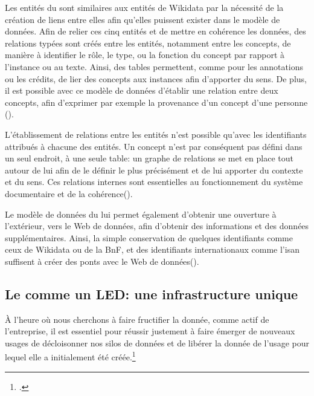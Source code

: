 Les entités du \ldd sont similaires aux entités de Wikidata par la nécessité de la création de liens entre elles afin qu'elles puissent exister dans le modèle de données. Afin de relier ces cinq entités et de mettre en cohérence les données, des relations typées sont créés entre les entités, notamment entre les concepts, de manière à identifier le rôle, le type, ou la fonction du concept par rapport à l'instance ou au texte. Ainsi, des tables permettent, comme pour les annotations ou les crédits, de lier des concepts aux instances afin d'apporter du sens. De plus, il est possible avec ce modèle de données d'établir une relation entre deux concepts, afin d'exprimer par exemple la provenance d'un concept d'une personne (). 


L'établissement de relations entre les entités n'est possible qu'avec les identifiants attribués à chacune des entités. Un concept n'est par conséquent pas défini dans un seul endroit, à une seule table: un graphe de relations se met en place tout autour de lui afin de le définir le plus précisément et de lui apporter du contexte et du sens. Ces relations internes sont essentielles au fonctionnement du système documentaire et de la cohérence().


Le modèle de données du \ldd lui permet également d'obtenir une ouverture à l'extérieur, vers le Web de données, afin d'obtenir des informations et des données supplémentaires. Ainsi, la simple conservation de quelques identifiants comme ceux de Wikidata ou de la BnF, et des identifiants internationaux comme l'\ac{isan} suffisent à créer des ponts avec le Web de données().


\subsection{\label{III-B-2-c}Le \ldd comme un LED: une infrastructure unique}

\begin{citationLongue}
	À l’heure où nous cherchons à faire fructifier la donnée, comme actif de l’entreprise, il est essentiel pour réussir justement à faire émerger de nouveaux usages de décloisonner nos silos de données et de libérer la donnée de l’usage pour lequel elle a initialement été créée.\footcite{poupeau_reflexions_2018}
\end{citationLongue}

